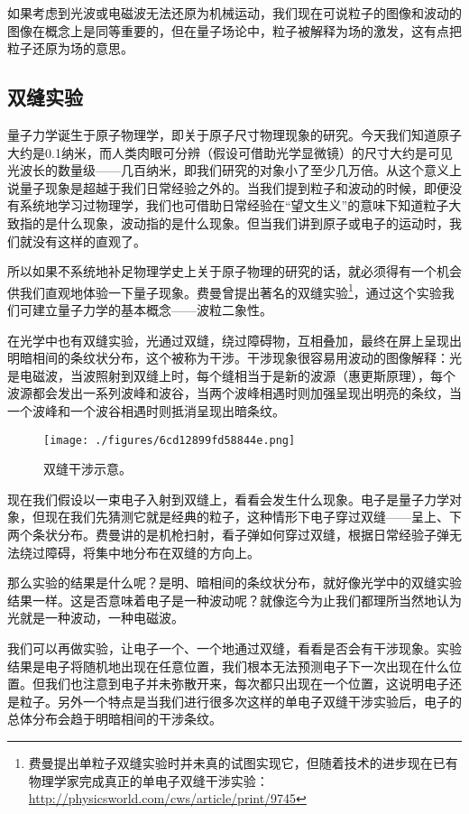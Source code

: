 如果考虑到光波或电磁波无法还原为机械运动，我们现在可说粒子的图像和波动的图像在概念上是同等重要的，但在量子场论中，粒子被解释为场的激发，这有点把粒子还原为场的意思。

\subsection{双缝实验}

量子力学诞生于原子物理学，即关于原子尺寸物理现象的研究。今天我们知道原子大约是0.1纳米，而人类肉眼可分辨（假设可借助光学显微镜）的尺寸大约是可见光波长的数量级——几百纳米，即我们研究的对象小了至少几万倍。从这个意义上说量子现象是超越于我们日常经验之外的。当我们提到粒子和波动的时候，即便没有系统地学习过物理学，我们也可借助日常经验在“望文生义”的意味下知道粒子大致指的是什么现象，波动指的是什么现象。但当我们讲到原子或电子的运动时，我们就没有这样的直观了。

所以如果不系统地补足物理学史上关于原子物理的研究的话，就必须得有一个机会供我们直观地体验一下量子现象。费曼曾提出著名的双缝实验\footnote{费曼提出单粒子双缝实验时并未真的试图实现它，但随着技术的进步现在已有物理学家完成真正的单电子双缝干涉实验：\url{http://physicsworld.com/cws/article/print/9745}}，通过这个实验我们可建立量子力学的基本概念——波粒二象性。

在光学中也有双缝实验，光通过双缝，绕过障碍物，互相叠加，最终在屏上呈现出明暗相间的条纹状分布，这个被称为干涉。干涉现象很容易用波动的图像解释：光是电磁波，当波照射到双缝上时，每个缝相当于是新的波源（惠更斯原理），每个波源都会发出一系列波峰和波谷，当两个波峰相遇时则加强呈现出明亮的条纹，当一个波峰和一个波谷相遇时则抵消呈现出暗条纹。

\begin{figure}[ht]
\centering
\texttt{[image: ./figures/6cd12899fd58844e.png]}
\caption{双缝⼲涉示意。} \label{fig_QMPre7_1}
\end{figure}

现在我们假设以一束电子入射到双缝上，看看会发生什么现象。电子是量子力学对象，但现在我们先猜测它就是经典的粒子，这种情形下电子穿过双缝——呈上、下两个条状分布。费曼讲的是机枪扫射，看子弹如何穿过双缝，根据日常经验子弹无法绕过障碍，将集中地分布在双缝的方向上。

那么实验的结果是什么呢？是明、暗相间的条纹状分布，就好像光学中的双缝实验结果一样。这是否意味着电子是一种波动呢？就像迄今为止我们都理所当然地认为光就是一种波动，一种电磁波。

我们可以再做实验，让电子一个、一个地通过双缝，看看是否会有干涉现象。实验结果是电子将随机地出现在任意位置，我们根本无法预测电子下一次出现在什么位置。但我们也注意到电子并未弥散开来，每次都只出现在一个位置，这说明电子还是粒子。另外一个特点是当我们进行很多次这样的单电子双缝干涉实验后，电子的总体分布会趋于明暗相间的干涉条纹。

